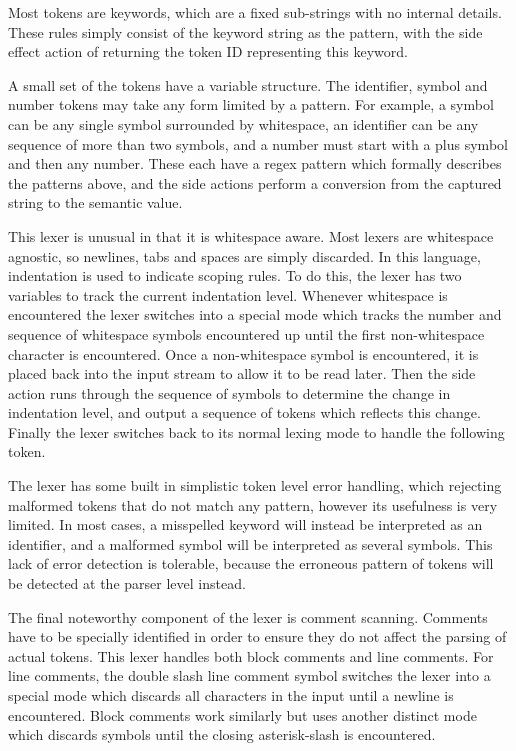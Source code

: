 \documentclass[11pt]{article}
\begin{document}
Most tokens are keywords, which are a fixed sub-strings with no internal details. These rules simply consist of the keyword string as the pattern, with the side effect action of returning the token ID representing this keyword.

A small set of the tokens have a variable structure. The identifier, symbol and number tokens may take any form limited by a pattern. For example, a symbol can be any single symbol surrounded by whitespace, an identifier can be any sequence of more than two symbols, and a number must start with a plus symbol and then any number. These each have a regex pattern which formally describes the patterns above, and the side actions perform a conversion from the captured string to the semantic value.

This lexer is unusual in that it is whitespace aware. Most lexers are whitespace agnostic, so newlines, tabs and spaces are simply discarded. In this language, indentation is used to indicate scoping rules. To do this, the lexer has two variables to track the current indentation level. Whenever whitespace is encountered the lexer switches into a special mode which tracks the number and sequence of whitespace symbols encountered up until the first non-whitespace character is encountered. Once a non-whitespace symbol is encountered, it is placed back into the input stream to allow it to be read later. Then the side action runs through the sequence of symbols to determine the change in indentation level, and output a sequence of tokens which reflects this change. Finally the lexer switches back to its normal lexing mode to handle the following token.

The lexer has some built in simplistic token level error handling, which rejecting malformed tokens that do not match any pattern, however its usefulness is very limited. In most cases, a misspelled keyword will instead be interpreted as an identifier, and a malformed symbol will be interpreted as several symbols. This lack of error detection is tolerable, because the erroneous pattern of tokens will be detected at the parser level instead.

The final noteworthy component of the lexer is comment scanning. Comments have to be specially identified in order to ensure they do not affect the parsing of actual tokens. This lexer handles both block comments and line comments. For line comments, the double slash line comment symbol switches the lexer into a special mode which discards all characters in the input until a newline is encountered. Block comments work similarly but uses another distinct mode which discards symbols until the closing asterisk-slash is encountered.
\end{document}
